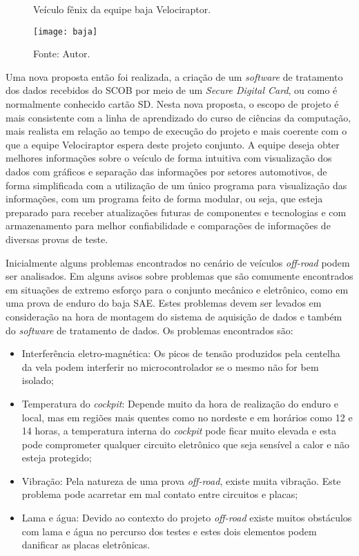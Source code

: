 \begin{figure}[!htb]
	\centering
		\caption{Veículo fênix da equipe baja Velociraptor.}
		\texttt{[image: baja]} 
		\caption*{Fonte: Autor.}
		\label{fig:baja}
\end{figure} 

Uma nova proposta então foi realizada, a criação de um \textit{software} de tratamento dos dados recebidos do SCOB por meio de um \textit{Secure Digital Card}, ou como é normalmente conhecido cartão SD. Nesta nova proposta, o escopo de projeto é mais consistente com a linha de aprendizado do curso de ciências da computação, mais realista em relação ao tempo de execução do projeto e mais coerente com o que a equipe Velociraptor espera deste projeto conjunto. A equipe deseja obter melhores informações sobre o veículo de forma intuitiva com visualização dos dados com gráficos e separação das informações por setores automotivos, de forma simplificada com a utilização de um único programa para visualização das informações, com um programa feito de forma modular, ou seja, que esteja preparado para receber atualizações futuras de componentes e tecnologias e com armazenamento para melhor confiabilidade e comparações de informações de diversas provas de teste.   

Inicialmente alguns problemas encontrados no cenário de veículos \textit{off-road} podem ser analisados. Em  alguns avisos sobre problemas que são comumente encontrados em situações de extremo esforço para o conjunto mecânico e eletrônico, como em uma prova de enduro do baja SAE. Estes problemas devem ser levados em consideração na hora de montagem do sistema de aquisição de dados e também do \textit{software} de tratamento de dados. Os problemas encontrados são:

\begin{itemize}
	\item  Interferência eletro-magnética: Os picos de tensão produzidos pela centelha da vela podem interferir no microcontrolador se o mesmo não for bem isolado; 
	\item Temperatura do \textit{cockpit}: Depende muito da hora de realização do enduro e local, mas em regiões mais quentes como no nordeste e em horários como 12 e 14 horas, a temperatura interna do \textit{cockpit} pode ficar muito elevada e esta pode comprometer qualquer circuito eletrônico que seja sensível a calor e não esteja protegido; 
	\item Vibração: Pela natureza de uma prova \textit{off-road}, existe muita vibração. Este problema pode acarretar em mal contato entre circuitos e placas;
	\item Lama e água: Devido ao contexto do projeto \textit{off-road} existe muitos obstáculos com lama e água no percurso dos testes e estes dois elementos podem danificar as placas eletrônicas.
\end{itemize}

